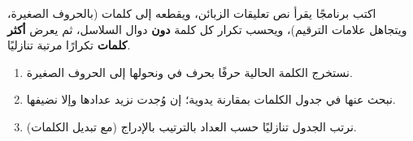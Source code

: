 \begin{statement}
اكتب برنامجًا يقرأ نص تعليقات الزبائن، ويقطعه إلى كلمات (بالحروف الصغيرة، ويتجاهل علامات الترقيم)، ويحسب تكرار كل كلمة \textbf{دون} دوال السلاسل، ثم يعرض \textbf{أكثر  كلمات} تكرارًا مرتبة تنازليًا.
\end{statement}
\begin{stepsbox}\begin{enumerate}
\item نستخرج الكلمة الحالية حرفًا بحرف في  ونحولها إلى الحروف الصغيرة.
\item نبحث عنها في جدول الكلمات بمقارنة يدوية؛ إن وُجدت نزيد عدادها وإلا نضيفها.
\item نرتب الجدول تنازليًا حسب العداد بالترتيب بالإدراج (مع تبديل الكلمات).
\end{enumerate}\end{stepsbox}
